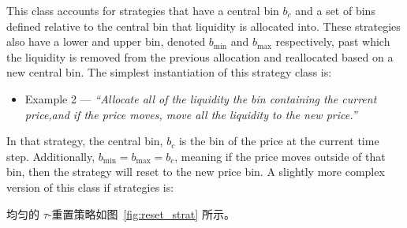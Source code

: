\documentclass[sigconf, dvipsnames]{acmart}
\newcommand{\dcp}[1]{\textcolor{blue}{{\scriptsize{David:}}#1}}
\begin{document}
This class accounts for strategies that have a central bin $b_c$ and 
a set of bins defined relative to the central bin that liquidity is allocated into. 
These strategies also have a lower and upper bin, denoted $b_{\min}$ and $b_{\max}$ respectively, 
past which the liquidity is removed from the previous allocation and reallocated based on a new central bin. 
The simplest instantiation of this strategy class is:
\begin{itemize}
    \item[] Example 2   --- \textit{``Allocate all of the liquidity the bin containing the current price,and if the price moves, move all the liquidity to the new price.''}
\end{itemize}
In that strategy, the central bin, $b_c$ is the bin of the price at the current time step. Additionally, $b_{\min}=b_{\max}=b_c$, meaning if the price moves outside of that bin, then the strategy will reset to the new price bin. A slightly more complex version of this class if strategies is:
\fi



均匀的 $\tau$-重置策略如图~\ref{fig:reset_strat} 所示。



\end{document}
